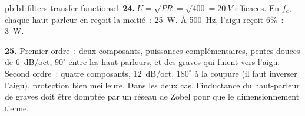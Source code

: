 \begin{solution}{pb:b1:filters-transfer-functions:1}
\textbf{24.} $U = \sqrt{PR} = \sqrt{400} = \qty{20}{V}$ efficaces. En
$f_c$, chaque haut-parleur en reçoit la moitié~: \qty{25}{W}. À
\qty{500}{Hz}, l'aigu reçoit $6\%$~: \qty{3}{W}.

\textbf{25.} Premier ordre~: deux composants, puissances
complémentaires, pentes douces de \qty{6}{dB/oct}, $90^\circ$ entre les
haut-parleurs, et des graves qui fuient vers l'aigu. Second ordre~:
quatre composants, \qty{12}{dB/oct}, $180^\circ$ à la coupure (il faut
inverser l'aigu), protection bien meilleure. Dans les deux cas,
l'inductance du haut-parleur de graves doit être domptée par un réseau
de Zobel pour que le dimensionnement tienne.
\end{solution}
